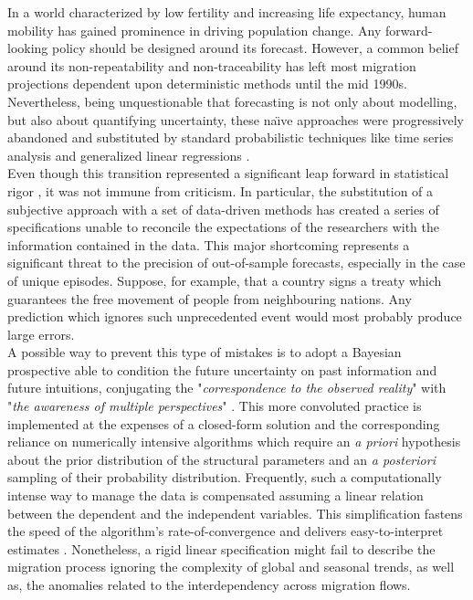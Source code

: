 \documentclass{article}\usepackage[]{graphicx}\usepackage[]{color}
\begin{document}
In a world characterized by low fertility and increasing life expectancy, human mobility has gained prominence in driving population change. Any forward-looking policy should be designed around its forecast. However, a common belief around its non-repeatability and non-traceability has left most migration projections dependent upon deterministic methods until the mid 1990s. Nevertheless, being unquestionable that forecasting is not only about modelling, but also about quantifying uncertainty, these na\"{\i}ve approaches were progressively abandoned and substituted by standard probabilistic techniques like time series analysis \cite{lee1994stochastic, de1997effect, keilman2002population, wilson2004australia, raymer2012does} and generalized linear regressions \cite{schmidt2000aggregate, alvarez2003potential, cohen2008international, cappelen2014forecasting}. \\ 
Even though this transition represented a significant leap forward in statistical rigor \cite{lutz2004}, it was not immune from criticism. In particular, the substitution of a subjective approach with a set of data-driven methods has created a series of specifications unable to reconcile the expectations of the researchers with the information contained in the data. This major shortcoming represents a significant threat to the precision of out-of-sample forecasts, especially in the case of unique episodes. Suppose, for example, that a country signs a treaty which guarantees the free movement of people from neighbouring nations. Any prediction which ignores such unprecedented event would most probably produce large errors. \\
A possible way to prevent this type of mistakes is to adopt a Bayesian prospective \cite{bijak2010bayesian, bijak2010forecasting, Billari2014, azose2015bayesian, azose2016probabilistic} able to condition the future uncertainty on past information and future intuitions, conjugating the "\textit{correspondence to the observed reality}" with "\textit{the awareness of multiple perspectives}" \cite{gelman2017beyond}. This more convoluted practice is implemented at the expenses of a closed-form solution and the corresponding reliance on numerically intensive algorithms which require an \textit{a priori} hypothesis about the prior distribution of the structural parameters and an \textit{a posteriori} sampling of their probability distribution. Frequently, such a computationally intense way to manage the data is compensated assuming a linear relation between the dependent and the independent variables. This simplification fastens the speed of the algorithm's rate-of-convergence and delivers easy-to-interpret estimates \cite{blake2012applied}. Nonetheless, a rigid linear specification might fail to describe the migration process ignoring the complexity of global and seasonal trends, as well as, the anomalies related to the interdependency across migration flows.\\   
\end{document}
